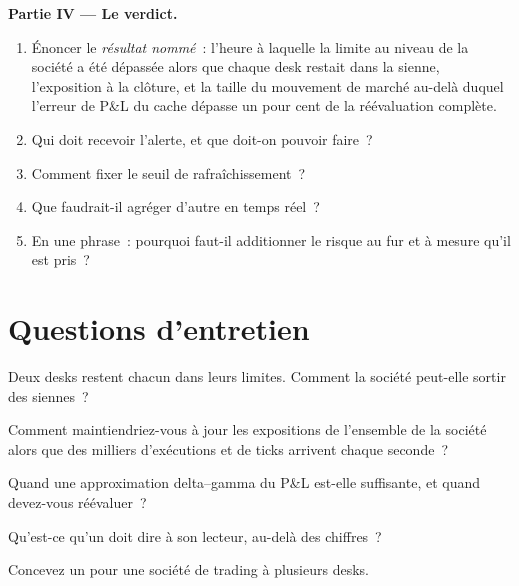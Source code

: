 \begin{problem}
\medskip\noindent\textbf{Partie IV --- Le verdict.}
\begin{enumerate}[resume]
\item Énoncer le \emph{résultat nommé}~: l'heure à laquelle la limite au niveau de la société a été dépassée alors que chaque desk restait dans la sienne, l'exposition à
la clôture, et la taille du mouvement de marché au-delà duquel l'erreur de P\&L du cache dépasse un pour cent de la réévaluation complète.
\item Qui doit recevoir l'alerte, et que doit-on pouvoir faire~?
\item Comment fixer le seuil de rafraîchissement~?
\item Que faudrait-il agréger d'autre en temps réel~?
\item En une phrase~: pourquoi faut-il additionner le risque au fur et à mesure qu'il est pris~?
\end{enumerate}
\end{problem}

\section{Questions d'entretien}

\begin{interviewq}\label{iq:pl:real-time-risk:1}
Deux desks restent chacun dans leurs limites. Comment la société peut-elle sortir des siennes~?
\end{interviewq}

\begin{interviewq}\label{iq:pl:real-time-risk:2}
Comment maintiendriez-vous à jour les expositions de l'ensemble de la société alors que des milliers d'exécutions et de ticks arrivent chaque seconde~?
\end{interviewq}

\begin{interviewq}\label{iq:pl:real-time-risk:3}
Quand une approximation delta--gamma du P\&L est-elle suffisante, et quand devez-vous réévaluer~?
\end{interviewq}

\begin{interviewq}\label{iq:pl:real-time-risk:4}
Qu'est-ce qu'un  doit dire à son lecteur, au-delà des chiffres~?
\end{interviewq}

\begin{interviewq}\label{iq:pl:real-time-risk:5}
Concevez un  pour une société de trading à plusieurs desks.
\end{interviewq}
